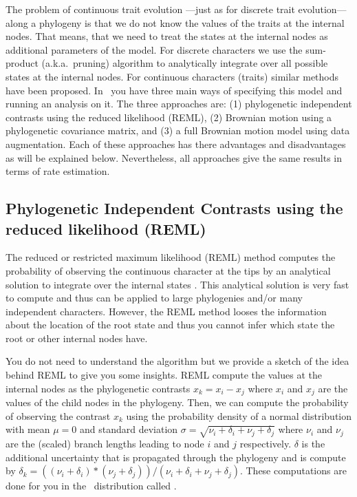 The problem of continuous trait evolution ---just as for discrete trait evolution--- along a phylogeny is that we do not know the values of the traits at the internal nodes. That means, that we need to treat the states at the internal nodes as additional parameters of the model. For discrete characters we use the sum-product (a.k.a.~pruning) algorithm \citep{Felsenstein1981} to analytically integrate over all possible states at the internal nodes. For continuous characters (traits) similar methods have been proposed.
In \RevBayes~you have three main ways of specifying this model and running an analysis on it. The three approaches are: (1) phylogenetic independent contrasts using the reduced likelihood (REML), (2) Brownian motion using a phylogenetic covariance matrix, and (3) a full Brownian motion model using data augmentation.
Each of these approaches has there advantages and disadvantages as will be explained below.
Nevertheless, all approaches give the same results in terms of rate estimation.


\subsection{Phylogenetic Independent Contrasts using the reduced likelihood (REML)}

The reduced or restricted maximum likelihood (REML) method computes the probability of observing the continuous character at the tips by an analytical solution to integrate over the internal states \citep{Felsenstein1985}. 
This analytical solution is very fast to compute and thus can be applied to large phylogenies and/or many independent characters. However, the REML method looses the information about the location of the root state and thus you cannot infer which state the root or other internal nodes have.

You do not need to understand the algorithm but we provide a sketch of the idea behind REML to give you some insights.
REML compute the values at the internal nodes as the phylogenetic contrasts $x_k = x_i - x_j$ where $x_i$ and $x_j$ are the values of the child nodes in the phylogeny.
Then, we can compute the probability of observing the contrast $x_k$ using the probability density of a normal distribution with mean $\mu = 0$ and standard deviation $\sigma = \sqrt{\nu_i + \delta_i + \nu_j + \delta_j}$ where $\nu_i$ and $\nu_j$ are the (scaled) branch lengths leading to node $i$ and $j$ respectively. $\delta$ is the additional uncertainty that is propagated through the phylogeny  and is compute by $\delta_k = ((\nu_i + \delta_i)*(\nu_j + \delta_j)) / (\nu_i + \delta_i + \nu_j + \delta_j)$. These computations are done for you in the \RevBayes~distribution called .

